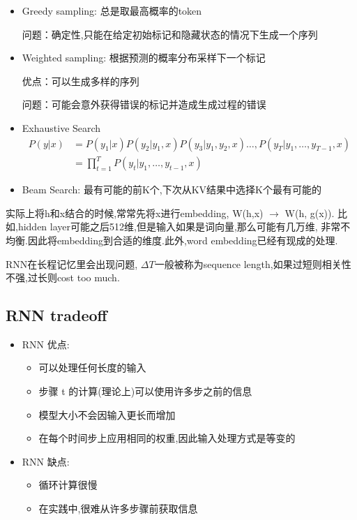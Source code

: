 	\begin{itemize}
		\item Greedy sampling: 总是取最高概率的token
		
		问题：确定性,只能在给定初始标记和隐藏状态的情况下生成一个序列

		\item Weighted sampling: 根据预测的概率分布采样下一个标记
		
		优点：可以生成多样的序列
		
		问题：可能会意外获得错误的标记并造成生成过程的错误
		
		\item Exhaustive Search
		\[
		\begin{aligned}P(y|x)&=P(y_1|x)P(y_2|y_1,x)P(y_3|y_1,y_2,x)\ldots,P(y_T|y_1,\ldots,y_{T-1},x)\\&=\prod_{t=1}^TP(y_t|y_1,\ldots,y_{t-1},x)\end{aligned}
		\]

		\item Beam Search: 最有可能的前K个,下次从KV结果中选择K个最有可能的
	\end{itemize}
	
	实际上将h和x结合的时候,常常先将x进行embedding, W(h,x) $\rightarrow$ W(h, g(x)).
	比如,hidden layer可能之后512维,但是输入如果是词向量,那么可能有几万维,
	非常不均衡.因此将embedding到合适的维度.此外,word embedding已经有现成的处理.
	
	RNN在长程记忆里会出现问题, $\Delta T$一般被称为sequence length,如果过短则相关性不强,过长则cost too much.
	
	\subsection{RNN tradeoff}
	\begin{itemize}
		\item RNN 优点:
		\begin {itemize}
			\item 可以处理任何长度的输入
			\item 步骤 t 的计算(理论上)可以使用许多步之前的信息
			\item 模型大小不会因输入更长而增加
			\item 在每个时间步上应用相同的权重,因此输入处理方式是等变的
		\end{itemize}
		\item RNN 缺点:
		\begin{itemize}
			\item 循环计算很慢
			\item 在实践中,很难从许多步骤前获取信息
		\end{itemize}
	\end{itemize}

